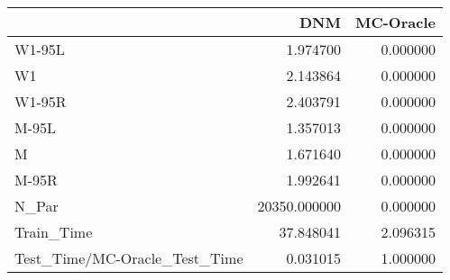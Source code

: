 \begin{tabular}{lrr}
\toprule
{} &           DNM &  MC-Oracle \\
\midrule
W1-95L                        &      1.974700 &   0.000000 \\
W1                            &      2.143864 &   0.000000 \\
W1-95R                        &      2.403791 &   0.000000 \\
M-95L                         &      1.357013 &   0.000000 \\
M                             &      1.671640 &   0.000000 \\
M-95R                         &      1.992641 &   0.000000 \\
N\_Par                         &  20350.000000 &   0.000000 \\
Train\_Time                    &     37.848041 &   2.096315 \\
Test\_Time/MC-Oracle\_Test\_Time &      0.031015 &   1.000000 \\
\bottomrule
\end{tabular}
